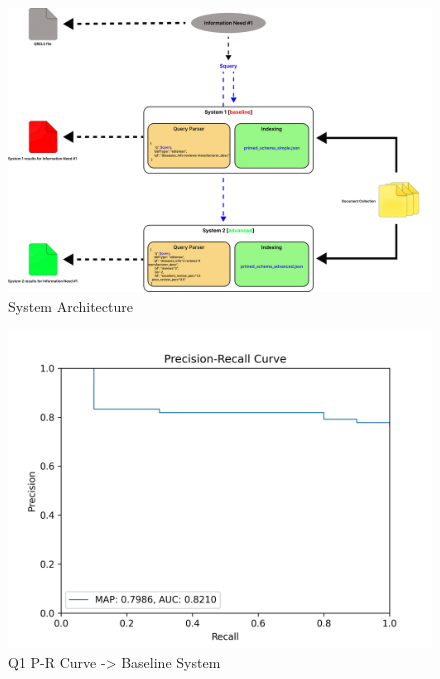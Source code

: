 \documentclass[sigconf]{acmart}
\begin{document}
\begin{figure}[H]
	\centering
	\includegraphics[width=\linewidth]{system_arch.png}
	\caption{System Architecture}
	\label{fig:sysArchitecture}
  \end{figure}
  
\begin{figure}[H]
  \centering
  \includegraphics[width=0.8\linewidth]{precision_recall_q1b.png}
  \caption{Q1 P-R Curve -> Baseline System}
  \label{fig:precisionRecallBaseline1}
\end{figure}
\end{document}
